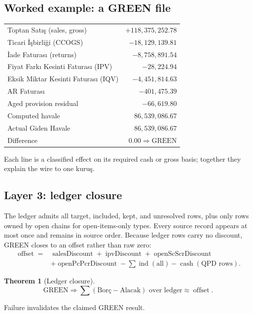 \documentclass[11pt,a4paper]{article}
\newcommand{\cash}{\operatorname{cash}}
\newcommand{\ind}{\operatorname{ind}}
\newtheorem{theorem}{Theorem}
\theoremstyle{definition}
\begin{document}
\subsection{Worked example: a GREEN file}
\begin{center}
\begin{tabular}{@{}lr@{}}
\toprule
Toptan Satış (sales, gross) & $+118{,}375{,}252.78$\\
Ticari İşbirliği (CCOGS) & $-18{,}129{,}139.81$\\
İade Faturası (returns) & $-8{,}758{,}891.54$\\
Fiyat Farkı Kesinti Faturası (IPV) & $-28{,}224.94$\\
Eksik Miktar Kesinti Faturası (IQV) & $-4{,}451{,}814.63$\\
AR Faturası & $-401{,}475.39$\\
Aged provision residual & $-66{,}619.80$\\
\midrule
Computed havale & $86{,}539{,}086.67$\\
Actual Giden Havale & $86{,}539{,}086.67$\\
Difference & $0.00\Rightarrow\mathrm{GREEN}$\\
\bottomrule
\end{tabular}
\end{center}
Each line is a classified effect on its required cash or gross basis;
together they explain the wire to one kuruş.

\subsection{Layer 3: ledger closure}
The ledger admits all target, included, kept, and unresolved rows, plus
only rows owned by open chains for open-items-only types. Every source
record appears at most once and remains in source order. Because ledger
rows carry no discount, GREEN closes to an offset rather than raw zero:
\begin{align*}
\operatorname{offset}={}&\operatorname{salesDiscount}
+\operatorname{ipvDiscount}+\operatorname{openScScrDiscount}\\
&+\operatorname{openPcPcrDiscount}
-\sum\ind(\text{all})-\cash(\text{QPD rows}).
\end{align*}
\begin{theorem}[Ledger closure]
\[
\mathrm{GREEN}\Rightarrow
\sum(\mathrm{Borç}-\mathrm{Alacak})\text{ over ledger}
\approx\operatorname{offset}.
\]
\end{theorem}
Failure invalidates the claimed GREEN result.
\end{document}
